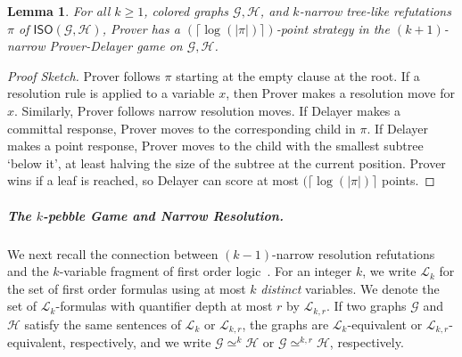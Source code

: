 \documentclass[10pt,a4paper]{article}
\newcommand{\klogic}[1]{\mathscr{L}_{#1}}
\newcommand{\kmlogic}[2]{\mathscr{L}_{#1, #2}}
\newcommand{\graphG}{\mathcal{G}}
\newcommand{\graphH}{\mathcal{H}}
\newcommand{\ISO}{\mathsf{ISO}(\graphG, \graphH)}
\newcommand{\kequiv}[1]{\simeq^{#1}}
\newcommand{\kequivr}[2]{\simeq^{#1,#2}}
\newtheorem{lemma}[theorem]{Lemma}
\begin{document}
\begin{lemma} \label{lem: game}
For all $k\ge 1$, colored graphs $\graphG, \graphH$, and $k$-narrow tree-like refutations $\pi$ of $\ISO$, Prover has a $(\lceil \log(|\pi|)  \rceil)$-point strategy in the $(k+1)$-narrow Prover-Delayer game on $\graphG,\graphH$. 
\end{lemma}

\begin{proof}[Proof Sketch]
Prover follows $\pi$ starting at the empty clause at the root.
If a resolution rule is applied to a variable $x$, then Prover makes a resolution move for $x$. Similarly, Prover follows narrow resolution moves.
If Delayer makes a committal response, Prover moves to the corresponding child in $\pi$.
If Delayer makes a point response, Prover moves to the child with the smallest subtree `below it', at least halving the size of the subtree at the current position. Prover wins if a leaf is reached, so Delayer can score at most $(\lceil \log(|\pi|)  \rceil$  points.
\end{proof}

\subparagraph*{The \texorpdfstring{$k$}{k}-pebble Game and Narrow Resolution.}
We next recall the connection between
$(k-1)$-narrow resolution refutations 
and the $k$-variable fragment of first order logic~\cite{DBLP:journals/tocl/ToranW23}.
For an integer $k$, we write $\klogic{k}$ for the set of first order formulas using at most $k$ \emph{distinct} variables.
We denote the set of  $\klogic{k}$-formulas with quantifier depth at most $r$ by $\kmlogic{k}{r}$.
If two graphs $\graphG$ and $\graphH$ satisfy the same sentences of $\klogic{k}$ or $\kmlogic{k}{r}$,
the graphs are $\klogic{k}$-equivalent or $\kmlogic{k}{r}$-equivalent, respectively, and we write $\graphG \kequiv{k} \graphH$ or $\graphG \kequivr{k}{r} \graphH$, respectively.
\end{document}
